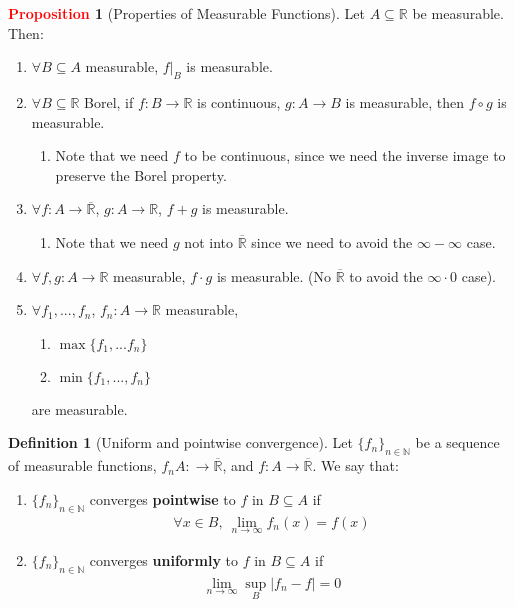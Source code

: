 \documentclass[11pt]{article}
\theoremstyle{definition}
\newtheorem{question}{Question}
\newcommand{\bb}[1]{\mathbb{#1}}
\theoremstyle{definition}
\newtheorem{definition}{\textcolor{OliveGreen}{Definition}}
\newtheorem{prop}{\textcolor{red}{Proposition}}
\theoremstyle{remark}
\begin{document}
\begin{prop}[Properties of Measurable Functions]
	Let $A \subseteq \bb{R}$ be measurable. Then: 
	\begin{enumerate}[nolistsep]
		\item $\forall B \subseteq A$ measurable, $f|_B$ is measurable. 
		\item $\forall B \subseteq \bb{R}$ Borel, if $f: B \rightarrow \bb{R}$ is continuous, $g: A \rightarrow B$ is measurable, then $f \circ g$ is measurable. 
		\begin{enumerate}[nolistsep]
			\item Note that we need $f$ to be continuous, since we need the inverse image to preserve the Borel property. 
		\end{enumerate}
		\item $\forall f: A \rightarrow \overline{\bb{R}}$, $g: A \rightarrow \bb{R}$, $f+g$ is measurable. 
		\begin{enumerate}[nolistsep]
			\item Note that we need $g$ not into $\overline{\bb{R}}$ since we need to avoid the $\infty - \infty$ case. 
		\end{enumerate}
		\item $\forall f, g: A \rightarrow \bb{R}$ measurable, $f \cdot g$ is measurable. (No $\overline{\bb{R}}$ to avoid the $\infty \cdot 0$ case). 
		\item $\forall f_1, ..., f_n$, $f_n: A \rightarrow \bb{R}$ measurable, 
		\begin{enumerate}[nolistsep]
			\item $\max \{f_1,...f_n \}$ 
			\item $\min \{f_1, ..., f_n \}$ 
		\end{enumerate}
		are measurable. 
	\end{enumerate}
\end{prop}


\begin{definition}[Uniform and pointwise convergence] 
	Let $\{ f_n \}_{n \in \bb{N}}$ be a sequence of measurable functions, $f_n A: \rightarrow \overline{\bb{R}}$, and $f: A \rightarrow \overline{\bb{R}}$. We say that: 
	\begin{enumerate}[noitemsep]
		\item $\{ f_n \}_{n \in \bb{N}}$ converges \textbf{pointwise} to $f$ in $B \subseteq A$ if 
		\begin{align*}
			\forall x \in B,\ \lim_{n \rightarrow \infty} f_n(x) = f(x) 	
		\end{align*}
		\item $\{ f_n \}_{n \in \bb{N}}$ converges \textbf{uniformly} to $f$ in $B \subseteq A$ if 
		\begin{align*}
			\lim_{n \rightarrow \infty} \sup_B | f_n - f| = 0 	
		\end{align*}

	\end{enumerate}
\end{definition}
\end{document}
